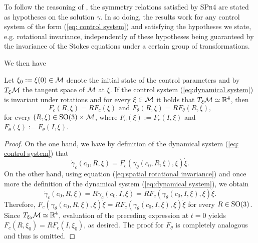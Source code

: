 \begin{remark}
To follow the reasoning of \cite{Alouges2017}, the symmetry relations satisfied by \textsc{SPr4} are stated as hypotheses on the solution $\gamma$. In so doing, the results work for any control system of the form (\ref{eq: control system}) and satisfying the hypotheses we state, e.g. rotational invariance, independently of these hypotheses being guaranteed by the invariance of the Stokes equations under a certain group of transformations. 
\end{remark}
We then have
\begin{proposition}
\label{prop: rotational invariance}
Let $\xi_0 := \xi(0) \in \mathcal{M}$ denote the initial state of the control parameters and by $T_{\xi}\mathcal{M}$ the tangent space of $\mathcal{M}$ at $\xi$. If the control system (\ref{eq:dynamical system}) is invariant under rotations and for every $\xi \in \mathcal{M}$ it holds that $T_{\xi} \mathcal{M} \simeq \mathbb{R}^4$, then
\begin{equation}
	F_c(R, \xi) = R F_c(\xi) \text { and } F_\theta(R, \xi) = R F_{\theta} (R, \xi),
\end{equation}
for every $(R, \xi) \in \operatorname{SO}(3) \times \mathcal{M}$, where $F_c(\xi) := F_{c}(I, \xi)$ and $F_{\theta}(\xi) := F_{\theta}(I, \xi)$. 
\end{proposition}

\begin{proof}
On the one hand, we have by definition of the dynamical system (\ref{eq: control system}) that
\begin{equation}
	\dot{\gamma}_c(c_0, R, \xi) = F_c(\gamma_{\theta}(c_0, R, \xi), \xi) \dot{\xi}.
\end{equation}
On the other hand, using equation (\ref{eq:spatial rotational invariance}) and once more the definition of the dynamical system (\ref{eq:dynamical system}), we obtain
\begin{equation}
	\dot{\gamma}_c (c_0, R, \xi) = R  \dot{\gamma}_c(c_0, I, \xi) = 
	R F_c(\gamma_{\theta}(c_0, I, \xi), \xi) \dot{\xi}.
\end{equation}
Therefore, $F_c(\gamma_{\theta}(c_0, R, \xi), \xi) \dot{\xi} = R F_{c}(\gamma_{\theta}(c_0, I, \xi), \xi) \dot{\xi}$ for every $R \in \operatorname{SO}(3)$. Since $T_{\xi_0} \mathcal{M} \simeq \mathbb{R}^4$, evaluation of the preceding expression at $t = 0$ yields $F_{c}(R, \xi_0) = R F_{c}(I, \xi_0)$, as desired. The proof for $F_{\theta}$ is completely analogous and thus is omitted.
\end{proof}

